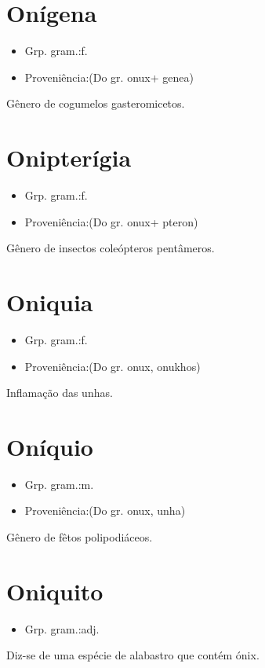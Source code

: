 \section{Onígena}
\begin{itemize}
\item {Grp. gram.:f.}
\end{itemize}
\begin{itemize}
\item {Proveniência:(Do gr. \textunderscore onux\textunderscore  + \textunderscore genea\textunderscore )}
\end{itemize}
Gênero de cogumelos gasteromicetos.
\section{Onipterígia}
\begin{itemize}
\item {Grp. gram.:f.}
\end{itemize}
\begin{itemize}
\item {Proveniência:(Do gr. \textunderscore onux\textunderscore  + \textunderscore pteron\textunderscore )}
\end{itemize}
Gênero de insectos coleópteros pentâmeros.
\section{Oniquia}
\begin{itemize}
\item {Grp. gram.:f.}
\end{itemize}
\begin{itemize}
\item {Proveniência:(Do gr. \textunderscore onux\textunderscore , \textunderscore onukhos\textunderscore )}
\end{itemize}
Inflamação das unhas.
\section{Oníquio}
\begin{itemize}
\item {Grp. gram.:m.}
\end{itemize}
\begin{itemize}
\item {Proveniência:(Do gr. \textunderscore onux\textunderscore , unha)}
\end{itemize}
Gênero de fêtos polipodiáceos.
\section{Oniquito}
\begin{itemize}
\item {Grp. gram.:adj.}
\end{itemize}
Diz-se de uma espécie de alabastro que contém ónix.
